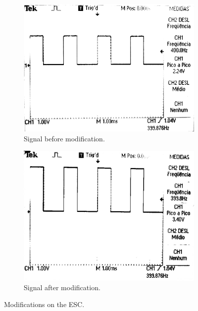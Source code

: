 \begin{figure}[H]
\begin{subfigure}{.5\textwidth}
  \centering
  \includegraphics[width=\linewidth]{figs/sinalruim.jpg}
  \caption{Signal before modification.}
  \label{fig:lowvoltage}
\end{subfigure}%
\begin{subfigure}{.5\textwidth}
  \centering
  \includegraphics[width=\linewidth]{figs/sinalbom.jpg}
  \caption{Signal after modification.}
    \label{fig:highvoltage}
\end{subfigure}

\caption{Modifications on the ESC.}
\label{fig:neldermeadsteps}
\end{figure}

